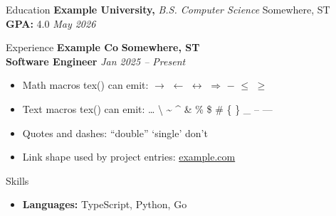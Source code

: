 \documentclass{czresume}
\begin{document}
\begin{rSection}{Education}
{\bf Example University,} {\em B.S. Computer Science} \hfill {Somewhere, ST}\\
\textbf{GPA:} 4.0 \hfill {\em May 2026}
\end{rSection}

\begin{rSection}{Experience}
\textbf{Example Co} \hfill \textbf{Somewhere, ST}\\
\textbf{Software Engineer} \hfill {\em Jan 2025 -- Present}
\begin{itemize}
  \item Math macros tex() can emit: $\rightarrow$ $\leftarrow$ $\leftrightarrow$
        $\Rightarrow$ $-$ $\leq$ $\geq$
  \item Text macros tex() can emit: \textbullet{} \texttrademark{}
        \textperiodcentered{} \ldots{} \textbackslash{} \textasciitilde{}
        \textasciicircum{} \& \% \$ \# \{ \} \_ -- ---
  \item Quotes and dashes: ``double'' `single' don't
  \item Link shape used by project entries: \href{https://example.com}{example.com}
\end{itemize}
\end{rSection}

\begin{rSection}{Skills}
\begin{itemize}
  \item \textbf{Languages:} TypeScript, Python, Go
\end{itemize}
\end{rSection}
\end{document}
